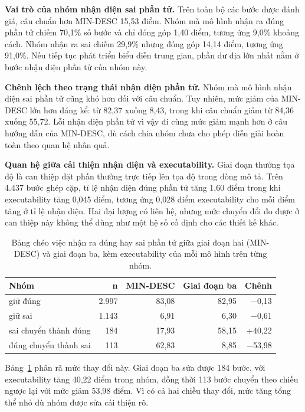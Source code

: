 \textbf{Vai trò của nhóm nhận diện sai phần tử.} Trên toàn bộ các bước được đánh giá, câu chuẩn hơn MIN-DESC 15,53 điểm. Nhóm mà mô hình nhận ra đúng phần tử chiếm 70,1\% số bước và chỉ đóng góp 1,40 điểm, tương ứng 9,0\% khoảng cách. Nhóm nhận ra sai chiếm 29,9\% nhưng đóng góp 14,14 điểm, tương ứng 91,0\%. Nếu tiếp tục phát triển biểu diễn trung gian, phần dư địa lớn nhất nằm ở bước nhận diện phần tử của nhóm này.

\textbf{Chênh lệch theo trạng thái nhận diện phần tử.} Nhóm mà mô hình nhận diện sai phần tử cũng khó hơn đối với câu chuẩn. Tuy nhiên, mức giảm của MIN-DESC lớn hơn đáng kể: từ 82,37 xuống 8,43, trong khi câu chuẩn giảm từ 84,36 xuống 55,72. Lỗi nhận diện phần tử vì vậy đi cùng mức giảm mạnh hơn ở câu hướng dẫn của MIN-DESC, dù cách chia nhóm chưa cho phép diễn giải hoàn toàn theo quan hệ nhân quả.

\textbf{Quan hệ giữa cải thiện nhận diện và executability.} Giai đoạn thưởng tọa độ là can thiệp đặt phần thưởng trực tiếp lên tọa độ trong dòng mô tả. Trên 4.437 bước ghép cặp, tỉ lệ nhận diện đúng phần tử tăng 1,60 điểm trong khi executability tăng 0,045 điểm, tương ứng 0,028 điểm executability cho mỗi điểm tăng ở tỉ lệ nhận diện. Hai đại lượng có liên hệ, nhưng mức chuyển đổi đo được ở can thiệp này không thể dùng như một hệ số cố định cho các thiết kế khác.

\begin{table}[htbp]
\centering\small
\caption{Bảng chéo việc nhận ra đúng hay sai phần tử giữa giai đoạn hai (MIN-DESC) và giai đoạn ba, kèm executability của mỗi mô hình trên từng nhóm.}\label{tab:A.12}
\begin{tabular}{@{}lrrrr@{}}
\toprule
\textbf{Nhóm} & \textbf{n} & \textbf{MIN-DESC} & \textbf{Giai đoạn ba} & \textbf{Chênh} \\
\midrule
giữ đúng & 2.997 & 83,08 & 82,95 & $-$0,13 \\
giữ sai & 1.143 & 6,91 & 6,30 & $-$0,61 \\
sai chuyển thành đúng & 184 & 17,93 & 58,15 & +40,22 \\
đúng chuyển thành sai & 113 & 62,83 & 8,85 & $-$53,98 \\
\bottomrule
\end{tabular}
\end{table}

Bảng~\ref{tab:A.12} phân rã mức thay đổi này. Giai đoạn ba sửa được 184 bước, với executability tăng 40,22 điểm trong nhóm, đồng thời 113 bước chuyển theo chiều ngược lại với mức giảm 53,98 điểm. Vì có cả hai chiều thay đổi, mức tăng tổng thể nhỏ dù nhóm được sửa cải thiện rõ.

